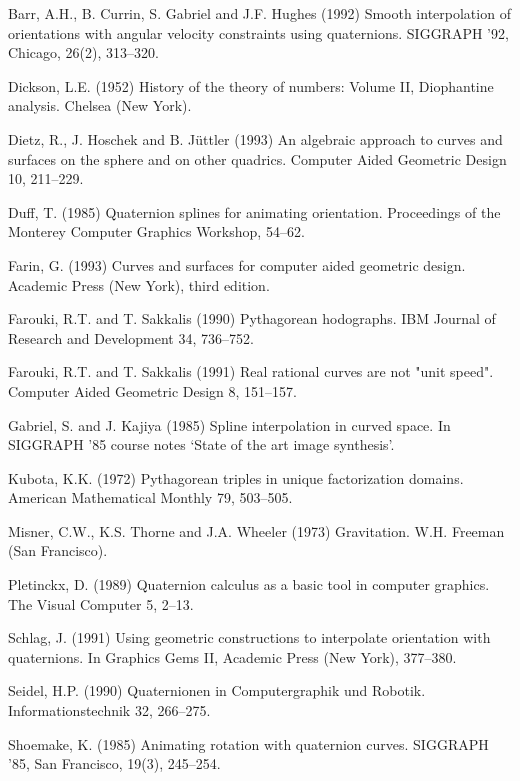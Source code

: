 
\begin{thebibliography}{Shoemake 85}

Barr, A.H., B. Currin, S. Gabriel and J.F. Hughes (1992)
Smooth interpolation of orientations with angular velocity
constraints using quaternions.  SIGGRAPH '92, Chicago, 26(2), 313--320.

Dickson, L.E. (1952) History of the theory of numbers: Volume II,
Diophantine analysis.  Chelsea (New York).

Dietz, R., J. Hoschek and B. J\"{u}ttler (1993)
An algebraic approach to curves and surfaces on the sphere and on other
quadrics.  Computer Aided Geometric Design 10, 211--229.

Duff, T. (1985) Quaternion splines for animating orientation.
Proceedings of the Monterey Computer Graphics Workshop,
54--62.

Farin, G. (1993) Curves and surfaces for computer aided geometric design.
Academic Press (New York), third edition.

Farouki, R.T. and T. Sakkalis (1990) Pythagorean hodographs.
IBM Journal of Research and Development 34, 736--752.

Farouki, R.T. and T. Sakkalis (1991) Real rational curves are not
"unit speed".  Computer Aided Geometric Design 8, 151--157.

Gabriel, S. and J. Kajiya (1985) Spline interpolation in curved space.
In SIGGRAPH '85 course notes `State of the art image synthesis'.

Kubota, K.K. (1972) Pythagorean triples in unique factorization domains.
American Mathematical Monthly 79, 503--505.

Misner, C.W., K.S. Thorne and J.A. Wheeler (1973)
Gravitation.  W.H. Freeman (San Francisco).

Pletinckx, D. (1989) Quaternion calculus as a basic tool in computer graphics.
The Visual Computer 5, 2--13.

Schlag, J. (1991) Using geometric constructions to interpolate
orientation with quaternions.  In Graphics Gems II, Academic Press (New York),
377--380.

Seidel, H.P. (1990) Quaternionen in Computergraphik und Robotik.
Informationstechnik 32, 266--275.

Shoemake, K. (1985) Animating rotation with quaternion curves.
SIGGRAPH '85, San Francisco, 19(3), 245--254.

\end{thebibliography}


